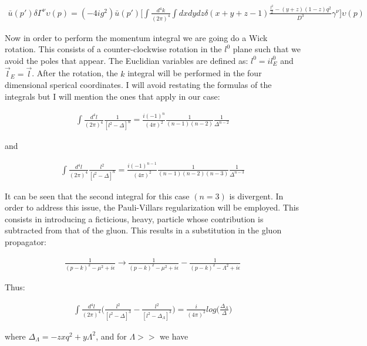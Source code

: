 \documentclass[a4paper,10pt]{article}
\begin{document}
\begin{align*}
 \bar{u}(p')\delta\Gamma^{\nu}\upsilon(p)=(-4ig^{2})\bar{u}(p')\Big[\int\frac{d^{4}k}{(2\pi)^{4}}\int dxdydz \delta(x+y+z-1)\frac{\frac{l^{2}}{2}-(y+z)(1-z)q^{2}}{D^{3}}\gamma^{\nu}\Big]\upsilon(p)
\end{align*}

 Now in order to perform the momentum integral we are going do a Wick rotation. This consists of a counter-clockwise
 rotation in the $l^{0}$ plane such that we avoid the poles that appear. The Euclidian variables are defined as:
 $l^{0}=il^{0}_{E}$ and $\vec{l}_{E}=\vec{l}$. After the rotation, the $k$ integral will be performed in the four
 dimensional sperical coordinates. I will avoid restating the formulas of the integrals but I will mention the ones
 that apply in our case:
 
 \begin{align*}
  \int \frac{d^{4}l}{(2\pi)^{4}}\frac{1}{[l^{2}-\Delta]^{n}}=\frac{i(-1)^{n}}{(4\pi)^{2}}\frac{1}{(n-1)(n-2)}\frac{1}{\Delta^{n-2}} 
 \end{align*}

 and

  \begin{align*}
  \int \frac{d^{4}l}{(2\pi)^{4}}\frac{l^{2}}{[l^{2}-\Delta]^{n}}=\frac{i(-1)^{n-1}}{(4\pi)^{2}}\frac{1}{(n-1)(n-2)(n-3)}\frac{1}{\Delta^{n-3}} 
 \end{align*}
 
 It can be seen that the second integral for this case $(n=3)$ is divergent. In order to address this issue, the 
 Pauli-Villars regularization will be employed. This consists in introducing a ficticious, heavy, particle whose 
 contribution is subtracted from that of the gluon. This results in a substitution in the gluon propagator:
 
 \begin{align*}
  \frac{1}{(p-k)^{2}-\mu^{2}+i\epsilon}\rightarrow \frac{1}{(p-k)^{2}-\mu^{2}+i\epsilon}-\frac{1}{(p-k)^{2}-\Lambda^{2}+i\epsilon}
 \end{align*}

Thus:

\begin{align*}
 \int \frac{d^{4}l}{(2\pi)^{4}}\Bigg(\frac{l^{2}}{[l^{2}-\Delta]^{3}}-\frac{l^{2}}{[l^{2}-\Delta_{\Lambda}]^{3}}\Bigg)=\frac{i}{(4\pi)^{2}}log\Big(\frac{\Delta_{\Lambda}}{\Delta}\Big)
 \end{align*}

 where $\Delta_{\Lambda}=-zxq^{2}+y\Lambda^{2}$, and for $\Lambda>>$ we have
\end{document}
